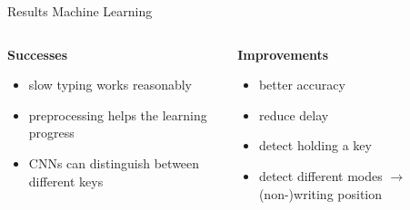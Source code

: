 \begin{frame}{Results Machine Learning}
    \begin{columns}[T]
        \begin{column}{0.5\textwidth}
            \textbf{Successes}
            \begin{itemize}
                \item slow typing works reasonably
                \item preprocessing helps the learning progress
                \item CNNs can distinguish between different keys
            \end{itemize}
        \end{column}
        \begin{column}{0.5\textwidth}
            \textbf{Improvements}
            \begin{itemize}
                \item better accuracy
                \item reduce delay
                \item detect holding a key
                \item detect different modes $\rightarrow$(non-)writing position
            \end{itemize}
        \end{column}
    \end{columns}
\end{frame}
